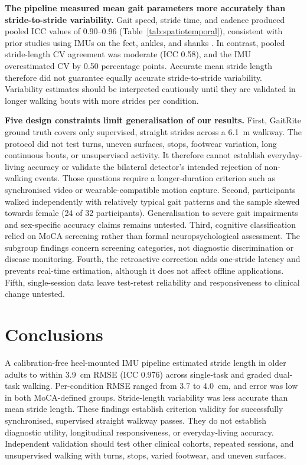 \documentclass[fleqn,10pt,lineno]{wlpeerj}
\begin{document}
\textbf{The pipeline measured mean gait parameters more accurately than stride-to-stride variability.} Gait speed, stride time, and cadence produced pooled ICC values of 0.90--0.96 (Table~\ref{tab:spatiotemporal}), consistent with prior studies using IMUs on the feet, ankles, and shanks \citep{Trojaniello2014, Washabaugh2017}. In contrast, pooled stride-length CV agreement was moderate (ICC 0.58), and the IMU overestimated CV by 0.50 percentage points. Accurate mean stride length therefore did not guarantee equally accurate stride-to-stride variability. Variability estimates should be interpreted cautiously until they are validated in longer walking bouts with more strides per condition.

\textbf{Five design constraints limit generalisation of our results.} First, GaitRite ground truth covers only supervised, straight strides across a 6.1~m walkway. The protocol did not test turns, uneven surfaces, stops, footwear variation, long continuous bouts, or unsupervised activity. It therefore cannot establish everyday-living accuracy or validate the bilateral detector's intended rejection of non-walking events. Those questions require a longer-duration criterion such as synchronised video or wearable-compatible motion capture. Second, participants walked independently with relatively typical gait patterns and the sample skewed towards female (24 of 32 participants). Generalisation to severe gait impairments and sex-specific accuracy claims remains untested. Third, cognitive classification relied on MoCA screening rather than formal neuropsychological assessment. The subgroup findings concern screening categories, not diagnostic discrimination or disease monitoring. Fourth, the retroactive correction adds one-stride latency and prevents real-time estimation, although it does not affect offline applications. Fifth, single-session data leave test-retest reliability and responsiveness to clinical change untested.


\clearpage
\section{Conclusions}

A calibration-free heel-mounted IMU pipeline estimated stride length in older adults to within 3.9~cm RMSE (ICC 0.976) across single-task and graded dual-task walking. Per-condition RMSE ranged from 3.7 to 4.0~cm, and error was low in both MoCA-defined groups. Stride-length variability was less accurate than mean stride length. These findings establish criterion validity for successfully synchronised, supervised straight walkway passes. They do not establish diagnostic utility, longitudinal responsiveness, or everyday-living accuracy. Independent validation should test other clinical cohorts, repeated sessions, and unsupervised walking with turns, stops, varied footwear, and uneven surfaces.
\end{document}
